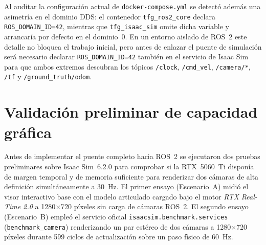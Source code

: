 Al auditar la configuración actual de \texttt{docker-compose.yml} se detectó además una asimetría en el dominio DDS: el contenedor \texttt{tfg\_ros2\_core} declara \texttt{ROS\_DOMAIN\_ID=42}, mientras que \texttt{tfg\_isaac\_sim} omite dicha variable y arrancaría por defecto en el dominio~\num{0}. En un entorno aislado de ROS~2 este detalle no bloquea el trabajo inicial, pero antes de enlazar el puente de simulación será necesario declarar \texttt{ROS\_DOMAIN\_ID=42} también en el servicio de Isaac Sim para que ambos extremos descubran los tópicos \texttt{/clock}, \texttt{/cmd\_vel}, \texttt{/camera/*}, \texttt{/tf} y \texttt{/ground\_truth/odom}.


\section{Validación preliminar de capacidad gráfica}
\label{sec:benchmark_hw}

Antes de implementar el puente completo hacia ROS~2 se ejecutaron dos pruebas preliminares sobre Isaac Sim~6.2.0 para comprobar si la RTX~5060~Ti disponía de margen temporal y de memoria suficiente para renderizar dos cámaras de alta definición simultáneamente a \qty{30}{\hertz}. El primer ensayo (Escenario~A) midió el visor interactivo base con el modelo articulado cargado bajo el motor \textit{RTX Real-Time 2.0} a \num{1280}\(\times\)\num{720} píxeles sin carga de cámaras ROS~2. El segundo ensayo (Escenario~B) empleó el servicio oficial \texttt{isaacsim.benchmark.services} (\texttt{benchmark\_camera}) renderizando un par estéreo de dos cámaras a \num{1280}\(\times\)\num{720} píxeles durante \num{599} ciclos de actualización sobre un paso físico de \qty{60}{\hertz}.


